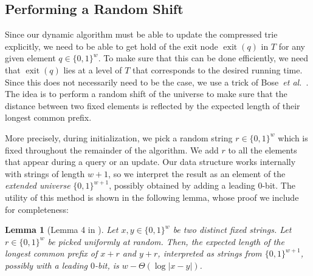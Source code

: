 \documentclass[a4paper,11pt]{article}
\newtheorem{lemma}[theorem]{Lemma}
\newcommand{\etal}{\emph{et al.}\xspace}
\newcommand{\?}{\mskip1.5mu}
\DeclareMathOperator{\exit}{exit}
\begin{document}
\subsection{Performing a Random Shift}

Since our dynamic algorithm must be able to update the
compressed trie explicitly, we need to be able to get hold
of the exit node $\exit(q)$ in $T$ for any given element 
$q \in \{0, 1\}^w$. To make sure that this can be done efficiently,
we need that $\exit(q)$ lies at a level of $T$ that corresponds to
the desired running time. Since this
does not necessarily need to be the case, we use a trick of 
Bose~\etal~\cite{BoseDoDuHoMo13}.
The idea is to perform a random shift of the universe to
make sure that the distance between two fixed elements
is reflected by the expected length of their longest common prefix. 

More precisely, during initialization, we pick a random 
string $r \in \{0, 1\}^w$ which is fixed throughout 
the remainder of the algorithm. We
add $r$ to all the elements that appear during a
query or an update. Our data structure works internally
with strings of length $w + 1$, so we interpret
the result as an element of the
\emph{extended universe} $\{0, 1\}^{w + 1}$, possibly
obtained by adding a leading $0$-bit.
The utility of this method is shown in
the following lemma, whose proof we include for completeness:

\begin{lemma}[Lemma 4 in \cite{BoseDoDuHoMo13}]
\label{lemma:delta_lca_loglog_delta}
Let $x, y \in \{0, 1\}^w$ be two distinct fixed strings.
Let $r \in \{0, 1\}^w$ be picked uniformly at random.
Then, the expected length of the longest common
prefix of $x + r$ and $y + r$, interpreted
as strings from $\{0, 1\}^{w+1}$, possibly with 
a leading $0$-bit,
is $w - \Theta(\log|x - y|)$.
\end{lemma}
\end{document}
